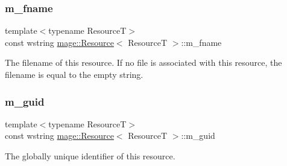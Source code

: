 \subsubsection{\texorpdfstring{m\+\_\+fname}{m\_fname}}
{\footnotesize\ttfamily template$<$typename ResourceT$>$ \\
const wstring \hyperlink{classmage_1_1_resource}{mage\+::\+Resource}$<$ ResourceT $>$\+::m\+\_\+fname\hspace{0.3cm}{\ttfamily [private]}}

The filename of this resource. If no file is associated with this resource, the filename is equal to the empty string. \hypertarget{classmage_1_1_resource_ad2924d9bc9ddecf06475b52a8c7065d8}{}\label{classmage_1_1_resource_ad2924d9bc9ddecf06475b52a8c7065d8} 
\subsubsection{\texorpdfstring{m\+\_\+guid}{m\_guid}}
{\footnotesize\ttfamily template$<$typename ResourceT$>$ \\
const wstring \hyperlink{classmage_1_1_resource}{mage\+::\+Resource}$<$ ResourceT $>$\+::m\+\_\+guid\hspace{0.3cm}{\ttfamily [private]}}

The globally unique identifier of this resource. 